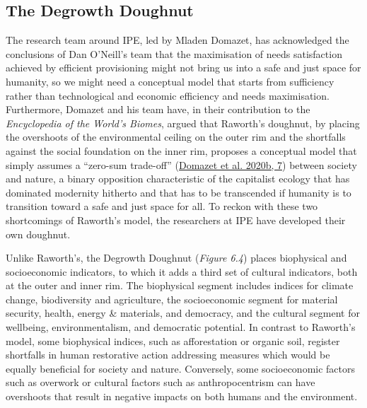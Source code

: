\documentclass[a4paper, nobind]{templates/ociamthesis}
\begin{document}
\hypertarget{the-degrowth-doughnut}{%
\subsection{The Degrowth Doughnut}\label{the-degrowth-doughnut}}

The research team around IPE, led by Mladen Domazet, has acknowledged the conclusions of Dan O'Neill's team that the maximisation of needs satisfaction achieved by efficient provisioning might not bring us into a safe and just space for humanity, so we might need a conceptual model that starts from sufficiency rather than technological and economic efficiency and needs maximisation. Furthermore, Domazet and his team have, in their contribution to the \emph{Encyclopedia of the World's Biomes}, argued that Raworth's doughnut, by placing the overshoots of the environmental ceiling on the outer rim and the shortfalls against the social foundation on the inner rim, proposes a conceptual model that simply assumes a ``zero-sum trade-off'' (\protect\hyperlink{ref-domazet_mental_2020}{Domazet et al. 2020b, 7}) between society and nature, a binary opposition characteristic of the capitalist ecology that has dominated modernity hitherto and that has to be transcended if humanity is to transition toward a safe and just space for all. To reckon with these two shortcomings of Raworth's model, the researchers at IPE have developed their own doughnut.

Unlike Raworth's, the Degrowth Doughnut (\emph{Figure 6.4}) places biophysical and socioeconomic indicators, to which it adds a third set of cultural indicators, both at the outer and inner rim. The biophysical segment includes indices for climate change, biodiversity and agriculture, the socioeconomic segment for material security, health, energy \& materials, and democracy, and the cultural segment for wellbeing, environmentalism, and democratic potential. In contrast to Raworth's model, some biophysical indices, such as afforestation or organic soil, register shortfalls in human restorative action addressing measures which would be equally beneficial for society and nature. Conversely, some socioeconomic factors such as overwork or cultural factors such as anthropocentrism can have overshoots that result in negative impacts on both humans and the environment.
\end{document}

